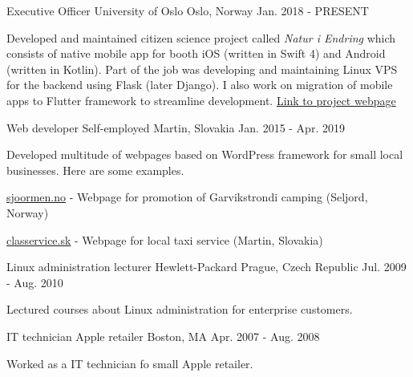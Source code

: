 
\begin{cventries}
  \cventry
    {Executive Officer} %
    {University of Oslo} %
    {Oslo, Norway} %
    {Jan. 2018 - PRESENT} %
    {
      \begin{cvitems} %
        \item {Developed and maintained citizen science project called \textit{Natur i Endring} which consists of native mobile app for booth iOS (written in Swift 4) and Android (written in Kotlin). Part of the job was developing and maintaining Linux VPS for the backend using Flask (later Django). I also work on migration of mobile apps to Flutter framework to streamline development. \href{https://naturiendring.no}{Link to project webpage}}
      \end{cvitems}
    }
    
    \cventry
    {Web developer} %
    {Self-employed} %
    {Martin, Slovakia} %
    {Jan. 2015 - Apr. 2019} %
    {
      \begin{cvitems} %
        \item {Developed multitude of webpages based on WordPress framework for small local businesses. Here are some examples.}
        \item {\href{https://sjoormen.no/}{sjoormen.no} - Webpage for promotion of Garvikstrondi camping (Seljord, Norway)}
        \item {\href{http://classervice.sk/en/}{classervice.sk} - Webpage for local taxi service (Martin, Slovakia)}
      \end{cvitems}
    }

  \cventry
    {Linux administration lecturer} %
    {Hewlett-Packard} %
    {Prague, Czech Republic} %
    {Jul. 2009 - Aug. 2010} %
    {
      \begin{cvitems} %
        \item {Lectured courses about Linux administration for enterprise customers.}
      \end{cvitems}
    }

  \cventry
    {IT technician} %
    {Apple retailer} %
    {Boston, MA} %
    {Apr. 2007 - Aug. 2008} %
    {
      \begin{cvitems} %
        \item {Worked as a IT technician fo small Apple retailer.}
      \end{cvitems}
    }

  
\end{cventries}
